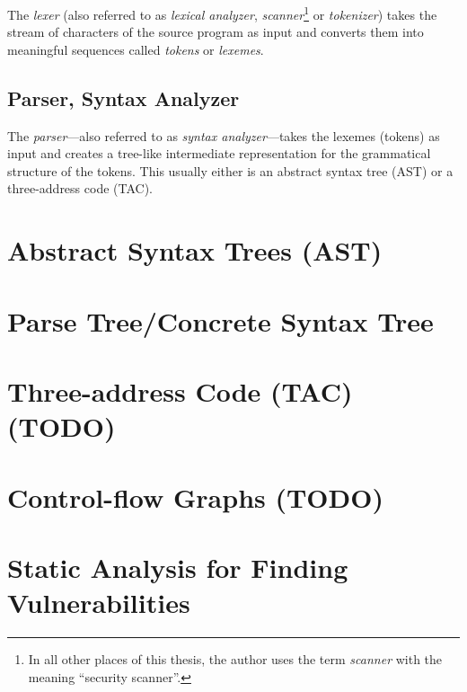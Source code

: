 The \emph{lexer} (also referred to as \emph{lexical analyzer}, \emph{scanner}\footnote{In all other places of this thesis, the author uses the term \emph{scanner} with the meaning ``security scanner''.} or \emph{tokenizer}) takes the stream of characters of the source program as input and converts them into meaningful sequences called \emph{tokens} or \emph{lexemes}.~\cite{compilers, compiler-construction}


\subsection{Parser, Syntax Analyzer}

The \emph{parser}---also referred to as \emph{syntax analyzer}---takes the lexemes (tokens) as input and creates a tree-like intermediate representation for the grammatical structure of the to\-kens. This usually either is an abstract syntax tree (AST) or a three-address code (TAC).~\cite{compilers, compiler-construction}


\section{Abstract Syntax Trees (AST)}
\label{ast}

\section{Parse Tree/Concrete Syntax Tree}
\label{parse-tree}

\section{Three-address Code (TAC) (TODO)}
\label{tac}

\section{Control-flow Graphs (TODO)}
\label{cfg}


\section{Static Analysis for Finding Vulnerabilities}

